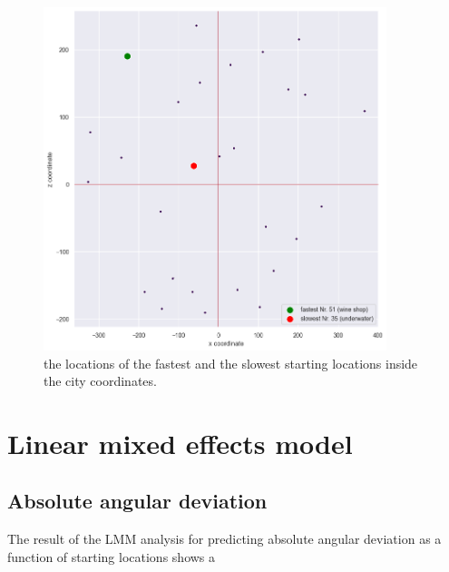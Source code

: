 \begin{figure}[h]
	\centering
	\includegraphics[width=100mm]{figures/fastest_slowest_starting_locations_RT.png}
	\caption[Locations of fastest and slowest starting locations in city]{the locations of the fastest and the slowest starting locations inside the city coordinates.}
	\label{fig:fastest_slowest_locs}
\end{figure}

\section{Linear mixed effects model}

\subsection{Absolute angular deviation}


The result of the LMM analysis for predicting absolute angular deviation as a function of starting locations shows a 

\begingroup %
\setlength\tabcolsep{3pt}
\footnotesize

\setlength\LTcapwidth{\textwidth} %

\setlength\LTleft{5pt}            %
\setlength\LTright{15pt}           %

